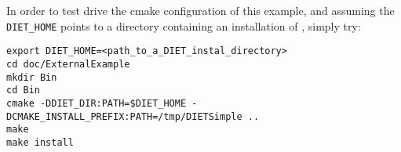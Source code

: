 In order to test drive the cmake configuration of this example, and
assuming the \texttt{DIET\_HOME} points to a directory containing
an installation of \diet, simply try:

{\footnotesize
\begin{verbatim}
export DIET_HOME=<path_to_a_DIET_instal_directory>
cd doc/ExternalExample
mkdir Bin
cd Bin
cmake -DDIET_DIR:PATH=$DIET_HOME -DCMAKE_INSTALL_PREFIX:PATH=/tmp/DIETSimple ..
make
make install
\end{verbatim}
}

